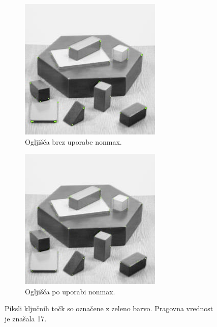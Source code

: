 \documentclass[a4paper,11pt]{article}
\begin{document}
\begin{figure}[hb]
	\centering
	\begin{subfigure}[t]{0.48\textwidth}
		\centering
		\includegraphics[width=\textwidth]{images/blox_corners_all.jpg}
		\caption{Ogljišča brez uporabe nonmax.}
		\label{img:kp_wo_nonmax}
	\end{subfigure}
	\hfill
	\begin{subfigure}[t]{0.48\textwidth}
		\centering
		\includegraphics[width=\textwidth]{images/blox_corners_nmax.jpg}
		\caption{Ogljišča po uporabi nonmax.}
		\label{img:kp_w_nonmax}
	\end{subfigure}
	\caption{Piksli ključnih točk so označene z zeleno barvo. Pragovna vrednost je znašala 17.}
	\label{img:kp_nonmax_comparison}
\end{figure}
\end{document}
